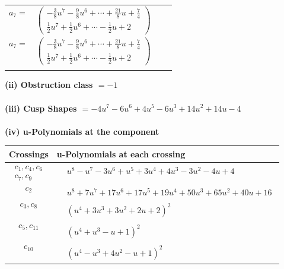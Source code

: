 \documentclass[1p]{elsarticle_modified}
\theoremstyle{definition}
\begin{document}
\begin{tabular}{m{7pt} m{180pt} m{7pt} m{180pt} }
\flushright $a_{7}=$&$\begin{pmatrix}-\frac{3}{8} u^7-\frac{9}{8} u^6+\cdots+\frac{21}{8} u+\frac{7}{4}\\\frac{1}{2} u^7+\frac{1}{2} u^6+\cdots-\frac{1}{2} u+2\end{pmatrix}$\\ \flushright $a_{7}=$&$\begin{pmatrix}-\frac{3}{8} u^7-\frac{9}{8} u^6+\cdots+\frac{21}{8} u+\frac{7}{4}\\\frac{1}{2} u^7+\frac{1}{2} u^6+\cdots-\frac{1}{2} u+2\end{pmatrix}$\\&\end{tabular}
\flushleft \textbf{(ii) Obstruction class $= -1$}\\~\\
\flushleft \textbf{(iii) Cusp Shapes $= -4 u^7-6 u^6+4 u^5-6 u^3+14 u^2+14 u-4$}\\~\\
\newpage\renewcommand{\arraystretch}{1}
\flushleft \textbf{(iv) u-Polynomials at the component}\newline \\
\begin{tabular}{m{50pt}|m{274pt}}
Crossings & \hspace{64pt}u-Polynomials at each crossing \\
\hline $$\begin{aligned}c_{1},c_{4},c_{6}\\c_{7},c_{9}\end{aligned}$$&$\begin{aligned}
&u^8- u^7-3 u^6+u^5+3 u^4+4 u^3-3 u^2-4 u+4
\end{aligned}$\\
\hline $$\begin{aligned}c_{2}\end{aligned}$$&$\begin{aligned}
&u^8+7 u^7+17 u^6+17 u^5+19 u^4+50 u^3+65 u^2+40 u+16
\end{aligned}$\\
\hline $$\begin{aligned}c_{3},c_{8}\end{aligned}$$&$\begin{aligned}
&(u^4+3 u^3+3 u^2+2 u+2)^2
\end{aligned}$\\
\hline $$\begin{aligned}c_{5},c_{11}\end{aligned}$$&$\begin{aligned}
&(u^4+u^3- u+1)^2
\end{aligned}$\\
\hline $$\begin{aligned}c_{10}\end{aligned}$$&$\begin{aligned}
&(u^4- u^3+4 u^2- u+1)^2
\end{aligned}$\\
\hline
\end{tabular}\\~\\
\end{document}
